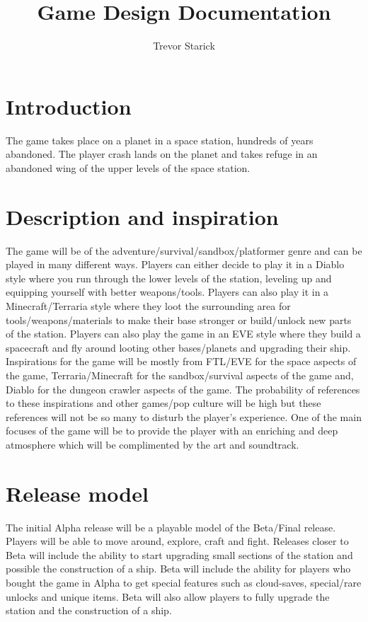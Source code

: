 \documentclass[12pt]{article}
\title{Game Design Documentation}
\author{Trevor Starick}
\begin{document}
\maketitle
\pagebreak
\tableofcontents
\pagebreak
\section{Introduction}
The game takes place on a planet in a space station, hundreds of years abandoned. The player crash lands on the planet and takes refuge in an abandoned wing of the upper levels of the space station. 
\section{Description and inspiration}
The game will be of the adventure/survival/sandbox/platformer genre and can be played in many different ways. Players can either decide to play it in a Diablo style where you run through the lower levels of the station, leveling up and equipping yourself with better weapons/tools. Players can also play it in a Minecraft/Terraria style where they loot the surrounding area for tools/weapons/materials to make their base stronger or build/unlock new parts of the station. Players can also play the game in an EVE style where they build a spacecraft and fly around looting other bases/planets and upgrading their ship. Inspirations for the game will be mostly from FTL/EVE for the space aspects of the game, Terraria/Minecraft for the sandbox/survival aspects of the game and, Diablo for the dungeon crawler aspects of the game. The probability of references to these inspirations and other games/pop culture will be high but these references will not be so many to disturb the player's experience. One of the main focuses of the game will be to provide the player with an enriching and deep atmosphere which will be complimented by the art and soundtrack. 
\section{Release model}
The initial Alpha release will be a playable model of the Beta/Final release. Players will be able to move around, explore, craft and fight. Releases closer to Beta will include the ability to start upgrading small sections of the station and possible the construction of a ship. Beta will include the ability for players who bought the game in Alpha to get special features such as cloud-saves, special/rare unlocks and unique items. Beta will also allow players to fully upgrade the station and the construction of a ship.
\end{document}
